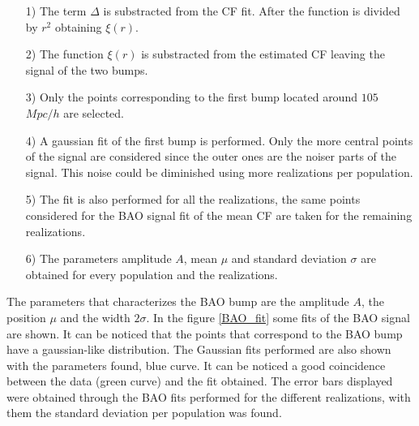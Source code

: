 \begin{itemize}

\item[1)] The term $\Delta$ is substracted from the CF fit. After the function
is divided by $r^2$ obtaining $\xi(r)$. 

\item[2)] The function $\xi(r)$ is substracted from the estimated CF leaving
the signal of the two bumps. 

\item[3)] Only the points corresponding to the first bump located around $105$ $Mpc/h$
are selected. 

\item[4)] A gaussian fit of the first bump is performed. Only the more central points
of the signal are considered since the outer ones are the noiser parts of the signal. This noise 
could be diminished using more realizations per population. 

\item[5)] The fit is also performed for all the realizations, the same points
considered for the BAO signal fit of the mean CF are taken for the remaining realizations. 

\item[6)] The parameters amplitude $A$, mean $\mu$ and standard deviation $\sigma$ are
obtained for every population and the realizations. 

\end{itemize}

The parameters that characterizes the BAO bump are the amplitude $A$, the position
$\mu$ and the width $2\sigma$. In the figure \ref{BAO_fit} some fits of the BAO
signal are shown. It can be noticed that the points that correspond to the BAO
bump have a gaussian-like distribution. The Gaussian fits performed are also shown
with the parameters found, blue curve. It can be noticed a good coincidence between 
the data (green curve) and the fit obtained. 
The error bars displayed were obtained through the BAO fits performed for the
different realizations, with them the standard deviation per population was found.  


